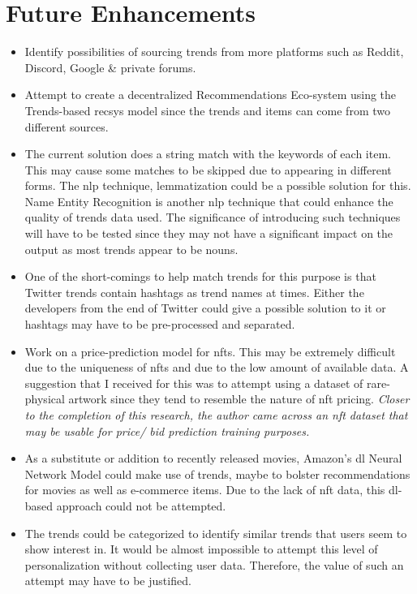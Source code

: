 \section{Future Enhancements}
\begin{itemize}
\item Identify possibilities of sourcing trends from more platforms such as Reddit, Discord, Google \& private forums.
\item Attempt to create a decentralized Recommendations Eco-system using the Trends-based \gls{recsys} model since the trends and items can come from two different sources.
\item The current solution does a string match with the keywords of each item. This may cause some matches to be skipped due to appearing in different forms. The \gls{nlp} technique, lemmatization could be a possible solution for this. Name Entity Recognition is another \gls{nlp} technique that could enhance the quality of trends data used. The significance of introducing such techniques will have to be tested since they may not have a significant impact on the output as most trends appear to be nouns.
\item One of the short-comings to help match trends for this purpose is that Twitter trends contain hashtags as trend names at times. Either the developers from the end of Twitter could give a possible solution to it or hashtags may have to be pre-processed and separated.
\item Work on a price-prediction model for \gls{nft}s. This may be extremely difficult due to the uniqueness of \gls{nft}s and due to the low amount of available data. A suggestion that I received for this was to attempt using a dataset of rare-physical artwork since they tend to resemble the nature of \gls{nft} pricing.
\textit{Closer to the completion of this research, the author came across an \gls{nft} dataset \autocite{zomglings_ethereum_2021} that may be usable for price/ bid prediction training purposes.}
\item As a substitute or addition to recently released movies, Amazon's \gls{dl} Neural Network Model could make use of trends, maybe to bolster recommendations for movies as well as e-commerce items. Due to the lack of \gls{nft} data, this \gls{dl}-based approach could not be attempted.
\item The trends could be categorized to identify similar trends that users seem to show interest in. It would be almost impossible to attempt this level of personalization without collecting user data. Therefore, the value of such an attempt may have to be justified.
\end{itemize}


